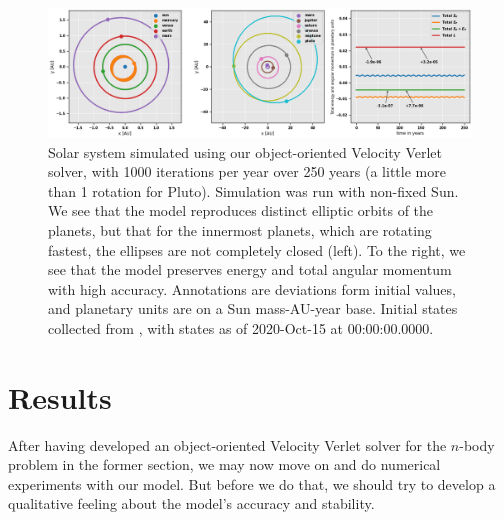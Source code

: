 \documentclass[]{article}
\begin{document}
\begin{figure}[!htb]
	\centering
	\includegraphics[width=1\linewidth]{solar-system.png}
	\caption{Solar system simulated using our object-oriented Velocity Verlet solver, with 1000 iterations per year over 250 years (a little more than 1 rotation for Pluto). Simulation was run with non-fixed Sun. We see that the model reproduces distinct elliptic orbits of the planets, but that for the innermost planets, which are rotating fastest, the ellipses are not completely closed (left). To the right, we see that the model preserves energy and total angular momentum with high accuracy. Annotations are deviations form initial values, and planetary units are on a Sun mass-AU-year base. Initial states collected from \cite{nasa-jpl}, with states as of 2020-Oct-15 at 00:00:00.0000.}
	\label{fig:solar-system}
\end{figure}


\section{Results} \label{results}
After having developed an object-oriented Velocity Verlet solver for the $n$-body problem in the former section, we may now move on and do numerical experiments with our model. But before we do that, we should try to develop a qualitative feeling about the model's accuracy and stability.
\end{document}
